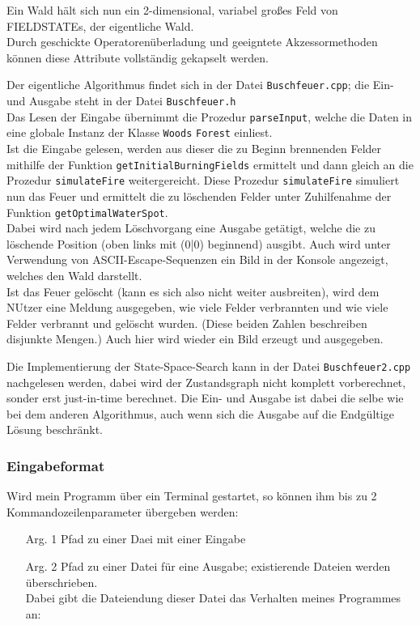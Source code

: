 Ein Wald hält sich nun ein 2-dimensional, variabel großes Feld von FIELDSTATEs, der eigentliche Wald.\\
Durch geschickte Operatorenüberladung und geeigntete Akzessormethoden können diese Attribute vollständig gekapselt werden.

Der eigentliche Algorithmus findet sich in der Datei \texttt{Buschfeuer.cpp}; die Ein- und Ausgabe steht in der Datei \texttt{Buschfeuer.h}\\
Das Lesen der Eingabe übernimmt die Prozedur \texttt{parseInput}, welche die Daten in eine globale Instanz der Klasse \texttt{Woods} \texttt{Forest} einliest.\\
Ist die Eingabe gelesen, werden aus dieser die zu Beginn brennenden Felder mithilfe der Funktion \texttt{getInitialBurningFields} ermittelt und dann gleich an die Prozedur \texttt{simulateFire} weitergereicht. Diese Prozedur \texttt{simulateFire} simuliert nun das Feuer und ermittelt die zu löschenden Felder unter Zuhilfenahme der Funktion \texttt{getOptimalWaterSpot}.\\
Dabei wird nach jedem Löschvorgang eine Ausgabe getätigt, welche die zu löschende Position (oben links mit (0|0) beginnend) ausgibt. Auch wird unter Verwendung von ASCII-Escape-Sequenzen ein Bild in der Konsole angezeigt, welches den Wald darstellt.\\
Ist das Feuer gelöscht (kann es sich also nicht weiter ausbreiten), wird dem NUtzer eine Meldung ausgegeben, wie viele Felder verbrannten und wie viele Felder verbrannt und gelöscht wurden. (Diese beiden Zahlen beschreiben disjunkte Mengen.) Auch hier wird wieder ein Bild erzeugt und ausgegeben.


Die Implementierung der State-Space-Search kann in der Datei \texttt{Buschfeuer2.cpp} nachgelesen werden, dabei wird der Zustandsgraph nicht komplett vorberechnet, sonder erst just-in-time berechnet. Die Ein- und Ausgabe ist dabei die selbe wie bei dem anderen Algorithmus, auch wenn sich die Ausgabe auf die Endgültige Lösung beschränkt.

\subsubsection{Eingabeformat}
Wird mein Programm über ein Terminal gestartet, so können ihm bis zu 2 Kommandozeilenparameter übergeben werden:
\begin{itemize}
\item[Arg. 1] Pfad zu einer Daei mit einer Eingabe
\item[Arg. 2] Pfad zu einer Datei für eine Ausgabe; existierende Dateien werden überschrieben.\\
Dabei gibt die Dateiendung dieser Datei das Verhalten meines Programmes an:
\end{itemize}
\newpage
